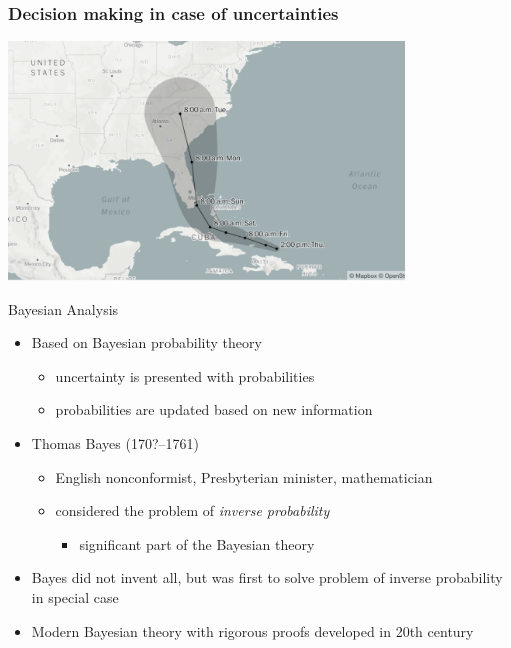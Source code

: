 \documentclass[english,t]{beamer}
\date{}
\begin{document}
\begin{frame}
  
  \frametitle{Decision making in case of uncertainties}

  \begin{center}
    \includegraphics[width=10.5cm]{irma.png}
  \end{center}
\end{frame}

\begin{frame}{Bayesian Analysis}

  \begin{itemize}
  \item Based on Bayesian probability theory
    \begin{itemize}
    \item uncertainty is presented with probabilities
    \item probabilities are updated based on new information
    \end{itemize}
    \pause
    \item Thomas Bayes (170?--1761)
    \begin{itemize}
    \item English nonconformist, Presbyterian minister,
      mathematician
    \item considered the problem of {\it inverse probability}
      \begin{itemize}
        \item significant part of the Bayesian theory
      \end{itemize}
  \end{itemize}
  \pause
  \item Bayes did not invent all, but was first to solve problem of
    inverse probability in special case
  \item Modern Bayesian theory with rigorous proofs developed in
    20th century
\end{itemize}
\end{frame}
\end{document}
